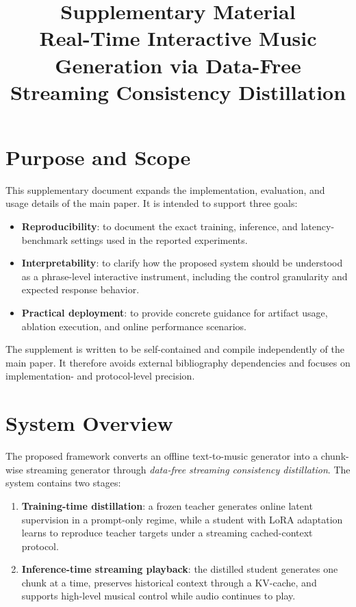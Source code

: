 \documentclass[11pt]{article}
\title{\textbf{Supplementary Material}\\Real-Time Interactive Music Generation via Data-Free Streaming Consistency Distillation}
\author{}
\date{}
\begin{document}
\maketitle

\section{Purpose and Scope}

This supplementary document expands the implementation, evaluation, and usage details of the main paper. It is intended to support three goals:
\begin{itemize}
    \item \textbf{Reproducibility}: to document the exact training, inference, and latency-benchmark settings used in the reported experiments.
    \item \textbf{Interpretability}: to clarify how the proposed system should be understood as a phrase-level interactive instrument, including the control granularity and expected response behavior.
    \item \textbf{Practical deployment}: to provide concrete guidance for artifact usage, ablation execution, and online performance scenarios.
\end{itemize}

The supplement is written to be self-contained and compile independently of the main paper. It therefore avoids external bibliography dependencies and focuses on implementation- and protocol-level precision.

\section{System Overview}

The proposed framework converts an offline text-to-music generator into a chunk-wise streaming generator through \emph{data-free streaming consistency distillation}. The system contains two stages:
\begin{enumerate}
    \item \textbf{Training-time distillation}: a frozen teacher generates online latent supervision in a prompt-only regime, while a student with LoRA adaptation learns to reproduce teacher targets under a streaming cached-context protocol.
    \item \textbf{Inference-time streaming playback}: the distilled student generates one chunk at a time, preserves historical context through a KV-cache, and supports high-level musical control while audio continues to play.
\end{enumerate}
\end{document}
